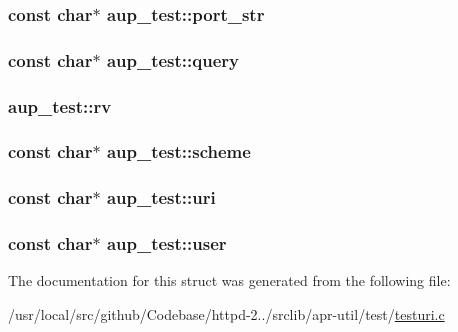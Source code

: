 \subsubsection[{\texorpdfstring{port\+\_\+str}{port_str}}]{\setlength{\rightskip}{0pt plus 5cm}const char$\ast$ aup\+\_\+test\+::port\+\_\+str}\hypertarget{structaup__test_aa00597cfee470cf3a5ebb4288d179de2}{}\label{structaup__test_aa00597cfee470cf3a5ebb4288d179de2}
\subsubsection[{\texorpdfstring{query}{query}}]{\setlength{\rightskip}{0pt plus 5cm}const char$\ast$ aup\+\_\+test\+::query}\hypertarget{structaup__test_a9f0d5cdbec9845c74d176c78af51af3c}{}\label{structaup__test_a9f0d5cdbec9845c74d176c78af51af3c}
\subsubsection[{\texorpdfstring{rv}{rv}}]{ aup\+\_\+test\+::rv}\hypertarget{structaup__test_a8c73099b5f7f9c19347aead4759c90b2}{}\label{structaup__test_a8c73099b5f7f9c19347aead4759c90b2}
\subsubsection[{\texorpdfstring{scheme}{scheme}}]{\setlength{\rightskip}{0pt plus 5cm}const char$\ast$ aup\+\_\+test\+::scheme}\hypertarget{structaup__test_a195e0e419638730c0ea2b2441e74e703}{}\label{structaup__test_a195e0e419638730c0ea2b2441e74e703}
\subsubsection[{\texorpdfstring{uri}{uri}}]{\setlength{\rightskip}{0pt plus 5cm}const char$\ast$ aup\+\_\+test\+::uri}\hypertarget{structaup__test_a9c44e811e9ea1e4da6a453d876f6a2e4}{}\label{structaup__test_a9c44e811e9ea1e4da6a453d876f6a2e4}
\subsubsection[{\texorpdfstring{user}{user}}]{\setlength{\rightskip}{0pt plus 5cm}const char$\ast$ aup\+\_\+test\+::user}\hypertarget{structaup__test_a8475b5c7f705a1c1a6359f14b8334f85}{}\label{structaup__test_a8475b5c7f705a1c1a6359f14b8334f85}


The documentation for this struct was generated from the following file\+:\begin{DoxyCompactItemize}
\item 
/usr/local/src/github/\+Codebase/httpd-\/2../srclib/apr-\/util/test/\hyperlink{testuri_8c}{testuri.\+c}\end{DoxyCompactItemize}
